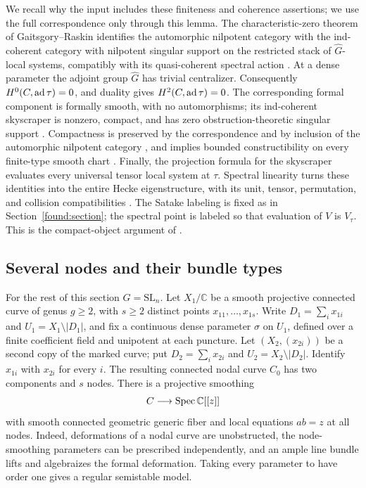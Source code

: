 We recall why the input includes these finiteness and coherence
assertions; we use the full correspondence only through this lemma.
The characteristic-zero theorem of Gaitsgory--Raskin identifies the
automorphic nilpotent category with the ind-coherent category with
nilpotent singular support on the restricted stack of
$\widehat G$-local systems, compatibly with its quasi-coherent spectral
action \cite[Main Theorem~1.3.9(ii), Lemma~1.3.7, and
Theorem~1.1.7]{GR}.  At a dense parameter the adjoint group
$\widehat G$ has trivial centralizer.  Consequently
$H^0(C,\operatorname{ad}\tau)=0$, and duality gives $H^2(C,\operatorname{ad}\tau)=0$.
The corresponding formal component is formally smooth, with no automorphisms;
its ind-coherent skyscraper is nonzero, compact, and has zero
obstruction-theoretic singular support
\cite[Proposition~3.7.2, Corollary~3.7.5, and
Sections~21.1--21.2]{AGKRRV}.  Compactness is preserved by the
correspondence and by inclusion of the automorphic nilpotent category
\cite[Theorem~1.1.7]{GR},
and implies bounded constructibility on every finite-type smooth
chart \cite[Appendix~F, Section~F.2.2]{AGKRRV}.  Finally, the projection
formula for the skyscraper evaluates every universal tensor local
system at $\tau$.  Spectral linearity turns these identities into the
entire Hecke eigenstructure, with its unit, tensor, permutation, and
collision compatibilities
\cite[Main Theorem~14.3.2 and Section~14.3.3]{AGKRRV}.
The Satake labeling is fixed as in Section~\ref{found:section}; the
spectral point is labeled so that evaluation of $V$ is $V_\tau$.
This is the compact-object argument of \cite[Lemma~8.1]{CT}.

\subsection{Several nodes and their bundle types}

For the rest of this section $G=\mathrm{SL}_n$.  Let $X_1/\mathbb C$
be a smooth projective connected curve of genus $g\geq2$, with
$s\geq2$ distinct points $x_{11},\ldots,x_{1s}$.  Write
$D_1=\sum_i x_{1i}$ and $U_1=X_1\setminus|D_1|$, and fix a
continuous dense parameter $\sigma$ on $U_1$, defined over a finite
coefficient field and unipotent at each puncture.  Let
$(X_2,(x_{2i}))$ be a second copy of the marked curve; put
$D_2=\sum_i x_{2i}$ and $U_2=X_2\setminus|D_2|$.  Identify
$x_{1i}$ with $x_{2i}$ for every $i$.  The resulting connected nodal
curve $C_0$ has two components and $s$ nodes.  There is a projective
smoothing
\[
 C\longrightarrow\operatorname{Spec}\mathbb C[[z]]
\]
with smooth connected geometric generic fiber and local equations
$ab=z$ at all nodes.  Indeed, deformations of a nodal curve are
unobstructed, the node-smoothing parameters can be prescribed
independently, and an ample line bundle lifts and algebraizes the
formal deformation.  Taking every parameter to have order one gives
a regular semistable model.

